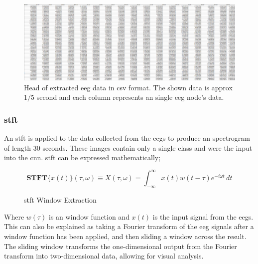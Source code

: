\documentclass[12pt]{article}
\begin{document}
\begin{figure}[H]
\includegraphics[width=\textwidth]{rawData}
\centering
\caption{Head of extracted \acrshort{eeg} data in \acrshort{csv} format. The shown data is approx $1/5$ second and each column represents an single \acrshort{eeg} node's data.}
\label{fig:rawData}
\end{figure}


\subsubsection{\acrfull{stft}}

An \acrshort{stft} is applied to the data collected from the \acrshort{eegs} to produce an spectrogram of length 30 seconds. These images contain only a single class and were the input into the \acrshort{cnn}. \acrshort{stft} can be expressed mathematically;\\

\begin{figure}[H]
\[  \mathbf{STFT}\{x(t)\}(\tau,\omega) \equiv X(\tau, \omega) = \int_{-\infty}^{\infty} x(t) w(t-\tau) e^{-i \omega t} \, d t   \]
\caption{\acrfull{stft} Window Extraction}
\label{eq:stft}
\end{figure}

Where $w(\tau)$ is an window function and $x(t)$ is the input signal from the \acrshort{eegs}.\\


This can also be explained as taking a Fourier transform of the \acrshort{eeg} signals after a window function has been applied, and then sliding a window across the result. The sliding window transforms the one-dimensional output from the Fourier transform into two-dimensional data, allowing for visual analysis.
\end{document}
